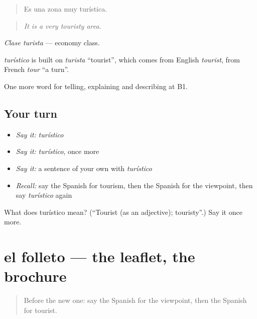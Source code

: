 \begin{quote}
Es una zona muy turística.
\end{quote}

\begin{quote}
\emph{It is a very touristy area.}
\end{quote}

\emph{Clase turista} — economy class.

\begin{cousinweb}
\emph{turístico} is built on \emph{turista} \textquotedblleft{}tourist\textquotedblright{}, which comes from English \emph{tourist}, from French \emph{tour} \textquotedblleft{}a turn\textquotedblright{}.
\end{cousinweb}

\begin{grammarlens}[title={What you've built}]
One more word for telling, explaining and describing at B1.
\end{grammarlens}

\subsection*{Your turn}
\begin{itemize}
\raggedright
  \item \emph{Say it:} \emph{turístico}
  \item \emph{Say it:} \emph{turístico}, once more
  \item \emph{Say it:} a sentence of your own with \emph{turístico}
  \item \emph{Recall:} say the Spanish for tourism, then the Spanish for the viewpoint, then say \emph{turístico} again
\end{itemize}

\begin{tcolorbox}[breakable,colback=teal!4,colframe=teal!35!black,title={Before you move on}]
What does turístico mean? (\textquotedblleft{}Tourist (as an adjective); touristy\textquotedblright{}.) Say it once more.
\end{tcolorbox}
\section[el folleto]{el folleto — the leaflet, the brochure}

\label{lesson:ES-C676-folleto}



\begin{quote}
Before the new one: say the Spanish for the viewpoint, then the Spanish for tourist.
\end{quote}

